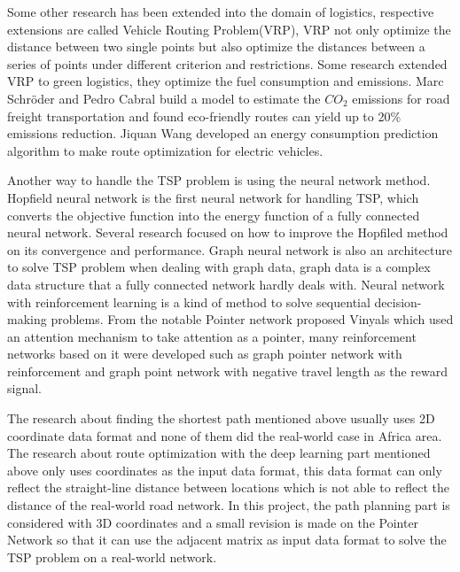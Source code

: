\documentclass[final-report]{report-template}
\begin{document}
Some other research has been extended into the domain of logistics, 
respective extensions are called Vehicle Routing Problem(VRP)\cite{BRAEKERS2016300}, 
VRP not only optimize the distance between two single points
but also optimize the distances between a series of points under different criterion and restrictions. 
Some research extended VRP to green logistics, 
they optimize the fuel consumption and emissions\cite{green_vehicle}.
Marc Schröder and Pedro Cabral\cite{article} build a model to estimate the $CO_2$ emissions for road freight transportation and found eco-friendly routes can yield up to 20\% emissions reduction.
Jiquan Wang\cite{battery_predict} developed an energy consumption prediction algorithm to make route optimization for electric vehicles.

Another way to handle the TSP problem is using the neural network method\cite{SHI2022681}.
Hopfield neural network\cite{Hopfield:1985aa} is the first neural network for handling TSP, 
which converts the objective function into the energy function of a fully connected neural network.
Several research focused on how to improve the Hopfiled method on its convergence\cite{Luo2019DesignAI} and performance\cite{10.1007/s00521-018-3535-9}\cite{improv_hop}.
Graph neural network is also an architecture to solve TSP problem\cite{graph_neural} when dealing with graph data, 
graph data is a complex data structure that a fully connected network hardly deals with.
Neural network with reinforcement learning\cite{vanOtterlo2012} is a kind of method to solve sequential decision-making problems.
From the notable Pointer network proposed Vinyals\cite{vinyals2017pointer} which used an attention mechanism to take attention as a pointer, 
many reinforcement networks based on it were developed such as graph pointer network with reinforcement\cite{ma2019combinatorial} 
and graph point network with negative travel length as the reward signal\cite{bello2017neural}.

The research about finding the shortest path mentioned above usually uses 2D coordinate data format and none of them did the real-world case in Africa area.
The research about route optimization with the deep learning part mentioned above only uses coordinates as the input data format, 
this data format can only reflect the straight-line distance between locations which is not able to reflect the distance of the real-world road network.
In this project, the path planning part is considered with 3D coordinates 
and a small revision is made on the Pointer Network so that it can use the adjacent matrix as input data format to solve the TSP problem on a real-world network.
\end{document}
